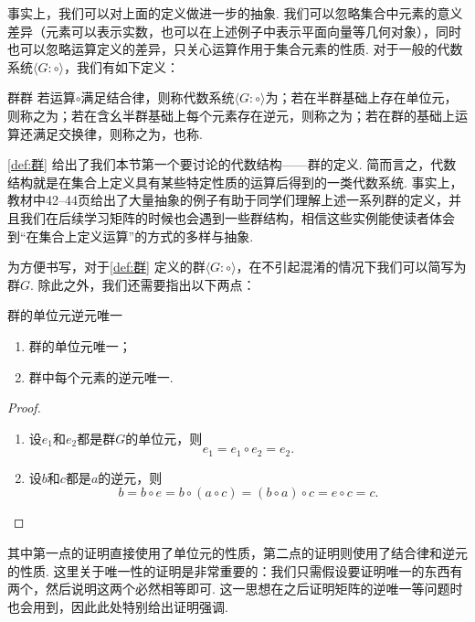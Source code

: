 事实上，我们可以对上面的定义做进一步的抽象. 我们可以忽略集合中元素的意义差异（元素可以表示实数，也可以在上述例子中表示平面向量等几何对象），同时也可以忽略运算定义的差异，只关心运算作用于集合元素的性质. 对于一般的代数系统$\langle G\colon\circ\rangle$，我们有如下定义：
\begin{definition}{群}{群}
    若运算$\circ$满足结合律，则称代数系统$\langle G\colon\circ\rangle$为；若在半群基础上存在单位元，则称之为；若在含幺半群基础上每个元素存在逆元，则称之为；若在群的基础上运算还满足交换律，则称之为，也称.
\end{definition}

\autoref{def:群} 给出了我们本节第一个要讨论的代数结构——群的定义. 简而言之，代数结构就是在集合上定义具有某些特定性质的运算后得到的一类代数系统. 事实上，教材中42--44页给出了大量抽象的例子有助于同学们理解上述一系列群的定义，并且我们在后续学习矩阵的时候也会遇到一些群结构，相信这些实例能使读者体会到``在集合上定义运算''的方式的多样与抽象.

为方便书写，对于\autoref{def:群} 定义的群$\langle G\colon\circ\rangle$，在不引起混淆的情况下我们可以简写为群$G$. 除此之外，我们还需要指出以下两点：
\begin{theorem}{}{群的单位元逆元唯一}
    \begin{enumerate}
        \item 群的单位元唯一；

        \item 群中每个元素的逆元唯一.
    \end{enumerate}
\end{theorem}

\begin{proof}
    \begin{enumerate}
        \item 设$e_1$和$e_2$都是群$G$的单位元，则
              \[e_1=e_1\circ e_2=e_2.\]

        \item 设$b$和$c$都是$a$的逆元，则
              \[b=b\circ e=b\circ(a\circ c)=(b\circ a)\circ c=e\circ c=c.\]
    \end{enumerate}
\end{proof}

其中第一点的证明直接使用了单位元的性质，第二点的证明则使用了结合律和逆元的性质. 这里关于唯一性的证明是非常重要的：我们只需假设要证明唯一的东西有两个，然后说明这两个必然相等即可. 这一思想在之后证明矩阵的逆唯一等问题时也会用到，因此此处特别给出证明强调.

